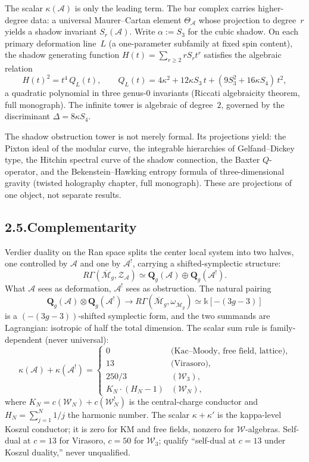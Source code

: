 \documentclass[11pt,reqno]{amsart}
\theoremstyle{definition}
\theoremstyle{remark}
\providecommand{\cA}{\mathcal{A}}
\providecommand{\Bbbk}{\mathbb{k}}
\numberwithin{equation}{section}
\begin{document}
The scalar $\kappa(\cA)$ is only the leading term. The bar complex
carries higher-degree data: a universal Maurer--Cartan element
$\Theta_\cA$ whose projection to degree~$r$ yields a shadow invariant
$S_r(\cA)$. Write $\alpha:=S_3$ for the cubic shadow.
On each primary deformation line~$L$ (a one-parameter subfamily
at fixed spin content), the shadow
generating function $H(t)=\sum_{r\ge 2}rS_rt^r$ satisfies the
algebraic relation
\begin{equation}\label{eq:preface-riccati-hook}
H(t)^2=t^4\,Q_L(t),\qquad Q_L(t)=4\kappa^2+12\kappa S_3\,t+(9S_3^2+16\kappa S_4)\,t^2,
\end{equation}
a quadratic polynomial in three genus-$0$ invariants
(Riccati algebraicity theorem, full monograph). The infinite tower is
algebraic of degree~$2$, governed by the discriminant
$\Delta=8\kappa S_4$.

The shadow obstruction tower is not merely formal. Its projections
yield: the Pixton ideal of the modular curve, the integrable
hierarchies of Gelfand--Dickey type, the Hitchin spectral curve of
the shadow connection, the Baxter $Q$-operator, and the
Bekenstein--Hawking entropy formula of three-dimensional gravity
(twisted holography chapter, full monograph). These are
projections of one object, not separate results.

\subsection*{2.5.\enspace Complementarity}

Verdier duality on the Ran space splits the center local system into
two halves, one controlled by $\cA$ and one by $\cA^!$, carrying a
shifted-symplectic structure:
\[
R\Gamma(\overline{\mathcal M}_g,\mathcal Z_\cA)\simeq\mathbf Q_g(\cA)\oplus\mathbf Q_g(\cA^!).
\]
What $\cA$ sees as deformation, $\cA^!$ sees as obstruction. The
natural pairing
\[
\mathbf Q_g(\cA)\otimes\mathbf Q_g(\cA^!)\to R\Gamma(\overline{\mathcal M}_g,\omega_{\overline{\mathcal M}_g})\simeq\Bbbk[-(3g-3)]
\]
is a $(-(3g-3))$-shifted symplectic form, and the two summands are
Lagrangian: isotropic of half the total dimension. The scalar sum
rule is family-dependent (never universal):
\[
\kappa(\cA)+\kappa(\cA^!)=\begin{cases}0&\text{(Kac--Moody, free field, lattice)},\\ 13&\text{(Virasoro)},\\ 250/3&(\mathcal W_3),\\ K_N\cdot(H_N-1)&(\mathcal W_N),\end{cases}
\]
where $K_N=c(\mathcal W_N)+c(\mathcal W_N^!)$ is the central-charge
conductor and $H_N=\sum_{j=1}^N 1/j$ the harmonic number.
The scalar $\kappa+\kappa'$ is the kappa-level Koszul conductor;
it is zero for KM and free fields, nonzero for $\mathcal W$-algebras.
Self-dual at $c=13$ for Virasoro, $c=50$ for $\mathcal W_3$; qualify
``self-dual at $c=13$ under Koszul
duality,'' never unqualified.
\end{document}
